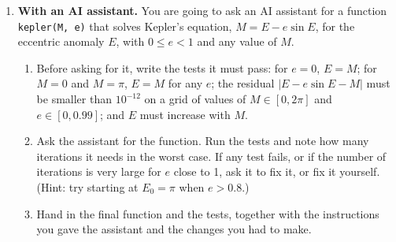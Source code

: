 \begin{enumerate}
\item \label{ej:kepler_ia-en} \textbf{With an AI assistant.} You are going to ask an AI assistant for a function \texttt{kepler(M, e)} that solves Kepler's equation, $M = E - e\sin E$, for the eccentric anomaly $E$, with $0\leq e<1$ and any value of $M$.
\begin{enumerate}
\item Before asking for it, write the tests it must pass: for $e=0$, $E=M$; for $M=0$ and $M=\pi$, $E=M$ for any $e$; the residual $\vert E-e\sin E-M\vert$ must be smaller than $10^{-12}$ on a grid of values of $M\in[0,2\pi]$ and $e\in[0,0.99]$; and $E$ must increase with $M$.
\item Ask the assistant for the function. Run the tests and note how many iterations it needs in the worst case. If any test fails, or if the number of iterations is very large for $e$ close to 1, ask it to fix it, or fix it yourself. (Hint: try starting at $E_0=\pi$ when $e>0.8$.)
\item Hand in the final function and the tests, together with the instructions you gave the assistant and the changes you had to make.
\end{enumerate}
\end{enumerate}

